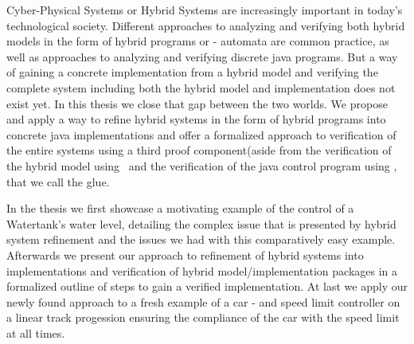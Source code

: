 
\Abstract
Cyber-Physical Systems or Hybrid Systems are increasingly important in today's technological society. Different approaches to analyzing and verifying both hybrid models in the form of hybrid programs or - automata are common practice, as well as approaches to analyzing and verifying discrete java programs. But a  way of gaining a concrete implementation from a hybrid model and verifying the complete system including both the hybrid model and implementation does not exist yet.
In this thesis we close that gap between the two worlds. We propose and apply a way to refine hybrid systems in the form of hybrid programs into concrete java implementations and offer a formalized approach to verification of the entire systems using a third proof component(aside from the verification of the hybrid model using \keym~and the verification of the java control program using \key, that we call the glue. 

In the thesis we first showcase a motivating example of the control of a Watertank's water level, detailing the complex issue that is presented by hybrid system refinement and the issues we had with this comparatively easy example. Afterwards we present our approach to refinement of hybrid systems into implementations and verification of hybrid model/implementation packages in a formalized outline of steps to gain a verified implementation. At last we apply our newly found approach to a fresh example of a car - and speed limit controller on a linear track progession ensuring the compliance of the car with the speed limit at all times.